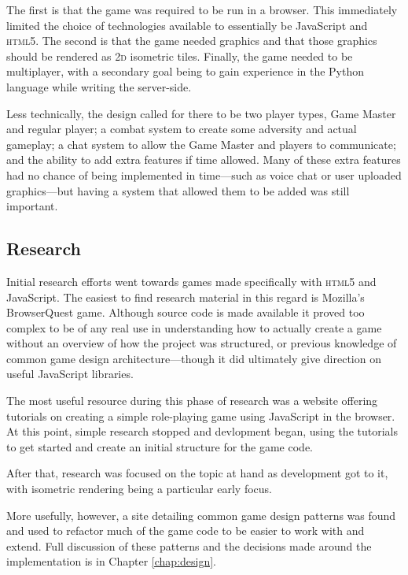 The first is that the game was required to be run in a browser. This immediately limited the choice of technologies available to essentially be JavaScript and \textsc{html5}. The second is that the game needed graphics and that those graphics should be rendered as \textsc{2d} isometric tiles. Finally, the game needed to be multiplayer, with a secondary goal being to gain experience in the Python language while writing the server-side.

Less technically, the design called for there to be two player types, Game Master and regular player; a combat system to create some adversity and actual gameplay; a chat system to allow the Game Master and players to communicate; and the ability to add extra features if time allowed. Many of these extra features had no chance of being implemented in time---such as voice chat or user uploaded graphics---but having a system that allowed them to be added was still important.

\subsection{Research}
Initial research efforts went towards games made specifically with \textsc{html5} and JavaScript. The easiest to find research material in this regard is Mozilla's BrowserQuest game\cite{citeulike:13139186, citeulike:13139189}. Although source code is made available\cite{citeulike:13139194} it proved too complex to be of any real use in understanding how to actually create a game without an overview of how the project was structured, or previous knowledge of common game design architecture---though it did ultimately give direction on useful JavaScript libraries.

The most useful resource during this phase of research was a website offering tutorials on creating a simple role-playing game using JavaScript in the browser\cite{citeulike:13139212}. At this point, simple research stopped and devlopment began, using the tutorials to get started and create an initial structure for the game code.

After that, research was focused on the topic at hand as development got to it, with isometric rendering being a particular early focus\cite{citeulike:13139216}.

More usefully, however, a site detailing common game design patterns was found\cite{citeulike:13049596} and used to refactor much of the game code to be easier to work with and extend. Full discussion of these patterns and the decisions made around the implementation is in Chapter \ref{chap:design}.





